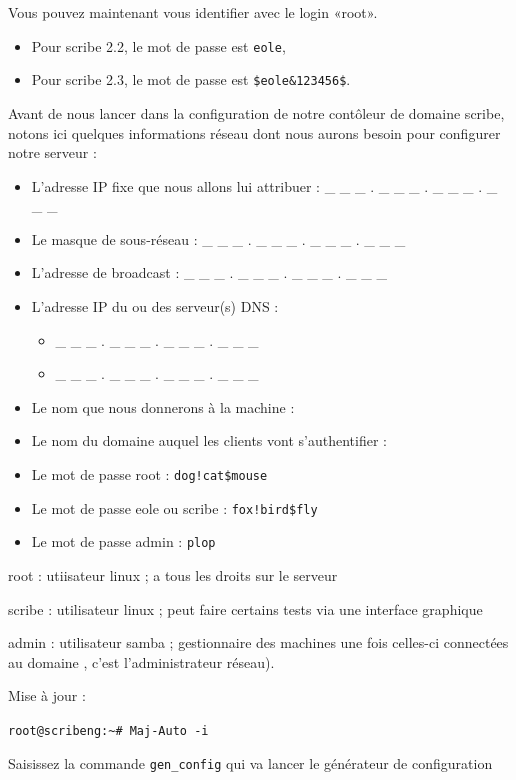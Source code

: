 \documentclass{article}
\begin{document}
Vous pouvez maintenant vous identifier avec le login «root».

\begin{itemize}
\item
  Pour scribe 2.2, le mot de passe est \lstinline!eole!,
\item
  Pour scribe 2.3, le mot de passe est \lstinline!$eole&123456$!.
\end{itemize}
Avant de nous lancer dans la configuration de notre contôleur de domaine
scribe, notons ici quelques informations réseau dont nous aurons besoin
pour configurer notre serveur :

\begin{itemize}
\item
  L'adresse IP fixe que nous allons lui attribuer : \_ \_ \_ . \_ \_ \_
  . \_ \_ \_ . \_ \_ \_
\item
  Le masque de sous-réseau : \_ \_ \_ . \_ \_ \_ . \_ \_ \_ . \_ \_ \_
\item
  L'adresse de broadcast : \_ \_ \_ . \_ \_ \_ . \_ \_ \_ . \_ \_ \_
\item
  L'adresse IP du ou des serveur(s) DNS :
  \begin{itemize}
  \item
    \_ \_ \_ . \_ \_ \_ . \_ \_ \_ . \_ \_ \_
  \item
    \_ \_ \_ . \_ \_ \_ . \_ \_ \_ . \_ \_ \_
  \end{itemize}
\item
  Le nom que nous donnerons à la machine :
\item
  Le nom du domaine auquel les clients vont s'authentifier :
\item
  Le mot de passe root : \lstinline"dog!cat$mouse"
\item
  Le mot de passe eole ou scribe : \lstinline"fox!bird$fly"
\item
  Le mot de passe admin : \lstinline!plop!
\end{itemize}
root : utiisateur linux ; a tous les droits sur le serveur

scribe : utilisateur linux ; peut faire certains tests via une interface
graphique

admin : utilisateur samba ; gestionnaire des machines une fois celles-ci
connectées au domaine , c'est l'administrateur réseau).

Mise à jour :

\lstinline!root@scribeng:~# Maj-Auto -i!

Saisissez la commande \lstinline!gen_config! qui va lancer le générateur
de configuration
\end{document}
